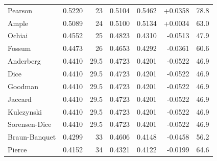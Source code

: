 \begin{table}[t]
{\begin{tabular}{lrrrrrr}
Pearson & 0.5220 & 23 & 0.5104 & 0.5462 & +0.0358 & 78.8 \\
Ample & 0.5089 & 24 & 0.5100 & 0.5134 & +0.0034 & 63.0 \\
Ochiai & 0.4552 & 25 & 0.4823 & 0.4310 & -0.0513 & 47.9 \\
Fossum & 0.4473 & 26 & 0.4653 & 0.4292 & -0.0361 & 60.6 \\
Anderberg & 0.4410 & 29.5 & 0.4723 & 0.4201 & -0.0522 & 46.9 \\
Dice & 0.4410 & 29.5 & 0.4723 & 0.4201 & -0.0522 & 46.9 \\
Goodman & 0.4410 & 29.5 & 0.4723 & 0.4201 & -0.0522 & 46.9 \\
Jaccard & 0.4410 & 29.5 & 0.4723 & 0.4201 & -0.0522 & 46.9 \\
Kulczynski & 0.4410 & 29.5 & 0.4723 & 0.4201 & -0.0522 & 46.9 \\
Sorensen-Dice & 0.4410 & 29.5 & 0.4723 & 0.4201 & -0.0522 & 46.9 \\
Braun-Banquet & 0.4299 & 33 & 0.4606 & 0.4148 & -0.0458 & 56.2 \\
Pierce & 0.4152 & 34 & 0.4321 & 0.4122 & -0.0199 & 64.6 \\
\bottomrule
\end{tabular}
}
\end{table}
